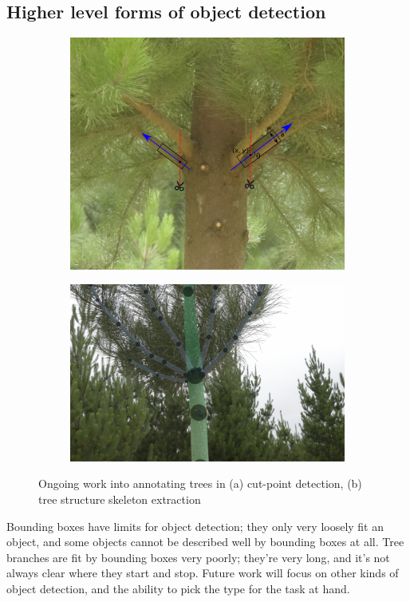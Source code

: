 \subsection{Higher level forms of object detection}

\begin{figure}[h!]
\begin{subfigure}[t]{1.0\linewidth}
  \centering
  \includegraphics[width=0.8\linewidth]{figures/future/tree_cutpoint.pdf}
  \caption{} 
\end{subfigure}

\begin{subfigure}[t]{1.0\linewidth}
  \centering
  \includegraphics[width=0.8\linewidth]{figures/future/tree_branches.jpg}
  \caption{} 
\end{subfigure}
\caption{Ongoing work into annotating trees in (a) cut-point detection, (b) tree structure skeleton extraction }
\label {fig:future_trees}
\end{figure}

Bounding boxes have limits for object detection; they only very loosely fit an object, and some objects cannot be described well by bounding boxes at all. Tree branches are fit by bounding boxes very poorly; they're very long, and it's not always clear where they start and stop. Future work will focus on other kinds of object detection, and the ability to pick the type for the task at hand.

